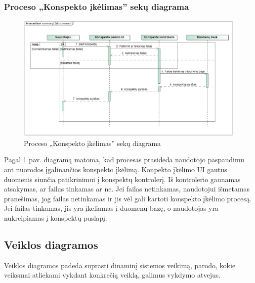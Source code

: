 \documentclass{VUMIFPSkursinis}
\begin{document}
\subsubsection{Proceso „Konspekto įkėlimas” sekų diagrama}
\begin{figure}[H]
	\centering
	\includegraphics[width=\linewidth]{img/summary.jpg}
	\caption{Proceso „Konspekto įkėlimas” sekų diagrama}
	\label{fig:summary}
\end{figure}
Pagal \ref{fig:summary} pav. diagramą matoma, kad procesas prasideda naudotojo paspaudimu ant nuorodos įgalinančios konspekto įkėlimą. Konpekto įkėlimo UI gautus duomenis siunčia patikrinimui į konspektų kontrolerį. Iš kontrolerio
gaunamas atsakymas, ar failas tinkamas ar ne. Jei failas netinkamas, naudotojui išmetamas pranešimas,
jog failas netinkamas ir jis vėl gali kartoti konspekto įkėlimo procesą. Jei failas tinkamas, jis yra įkeliamas į duomenų bazę, o
naudotojas yra nukreipiamas į konspektų puslapį.
\subsection{Veiklos diagramos}
Veiklos diagramos padeda suprasti dinaminį sistemos
veikimą, parodo, kokie veiksmai atliekami vykdant konkrečią veiklą, galimus vykdymo atvejus.
\end{document}
